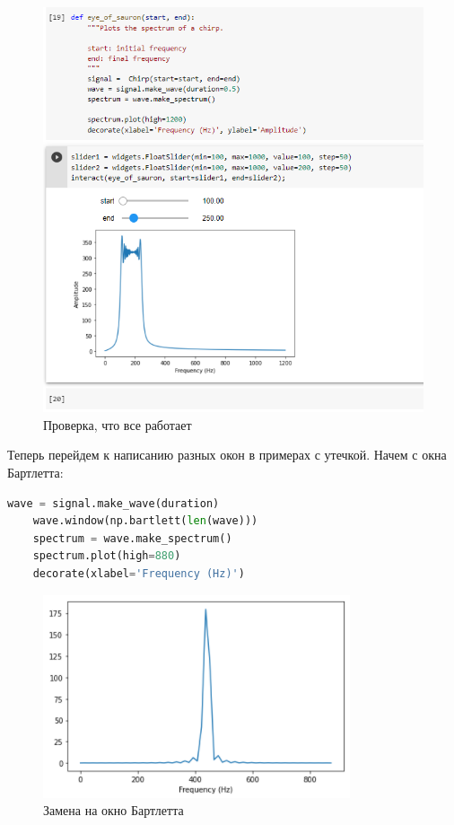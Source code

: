 \documentclass[a4paper]{article}
\begin{document}
            \begin{figure}[h]
                \centering
                \includegraphics[width=\textwidth]{ex_1_all_working.png}
                \caption{Проверка, что все работает}
                \label{fig:ex_1_all_working}
            \end{figure}
            
            Теперь перейдем к написанию разных окон в примерах с утечкой. Начем с окна Бартлетта:
            
\begin{lstlisting}[language=Python, caption= Окно Бартлетта]
    wave = signal.make_wave(duration)
    wave.window(np.bartlett(len(wave)))
    spectrum = wave.make_spectrum()
    spectrum.plot(high=880)
    decorate(xlabel='Frequency (Hz)')
\end{lstlisting}               
            
            \begin{figure}[H]
                \centering
                \includegraphics{ex_1_bartlett.png}
                \caption{Замена на окно Бартлетта}
                \label{fig:ex_1_bartlett}
            \end{figure}
            
\end{document}
